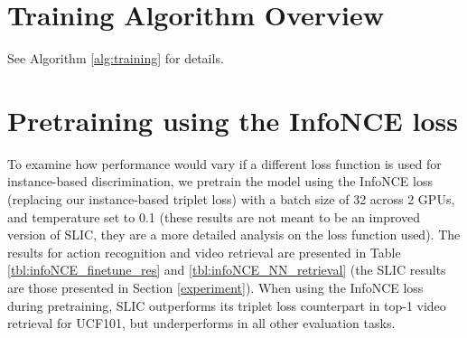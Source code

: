 \documentclass[10pt,twocolumn,letterpaper]{article}
\begin{document}
\section{Training Algorithm Overview}
See Algorithm \ref{alg:training} for details.
\label{algorithm_overview}



\section{Pretraining using the InfoNCE loss}
\label{slic_infonce}
To examine how performance would vary if a different loss function is used for instance-based discrimination, we pretrain the model using the InfoNCE loss \cite{pmlr-v9-gutmann10a} (replacing our instance-based triplet loss) with a batch size of 32 across 2 GPUs, and temperature set to 0.1 (these results are not meant to be an improved version of SLIC, they are a more detailed analysis on the loss function used). The results for action recognition and video retrieval are presented in Table \ref{tbl:infoNCE_finetune_res} and \ref{tbl:infoNCE_NN_retrieval} (the SLIC results are those presented in Section \ref{experiment}). When using the InfoNCE loss during pretraining, SLIC outperforms its triplet loss counterpart in top-1 video retrieval for UCF101, but underperforms in all other evaluation tasks. 
\end{document}
